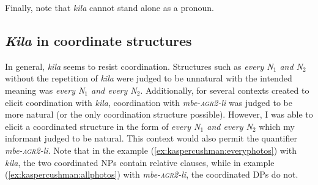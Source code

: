\documentclass[output=paper,modfonts,nonflat]{langsci/langscibook}
\begin{document}
Finally, note that \textit{kila} cannot stand alone as a pronoun.

\subsection{\textit{Kila} in coordinate structures}

In general, \textit{kila} seems to resist coordination. Structures such as \textit{every N$_{1}$ and N$_{2}$} without the repetition of \textit{kila} were judged to be unnatural with the intended meaning was \textit{every N$_{1}$ and every N$_{2}$}.  Additionally, for several contexts created to elicit coordination with \textit{kila}, coordination with \textit{mbe-\textsc{agr2}-li} was judged to be more natural (or the only coordination structure possible). However, I was able to elicit a coordinated structure in the form of \textit{every N$_{1}$ and every N$_{2}$} which my informant judged to be natural. This context would also permit the quantifier \textit{mbe-\textsc{agr2}-li}.  Note that in the example (\ref{ex:kaspercushman:everyphotos}) with \textit{kila}, the two coordinated NPs contain relative clauses, while in example (\ref{ex:kaspercushman:allphotos}) with \textit{mbe-\textsc{agr2}-li}, the coordinated DPs do not.
\end{document}
